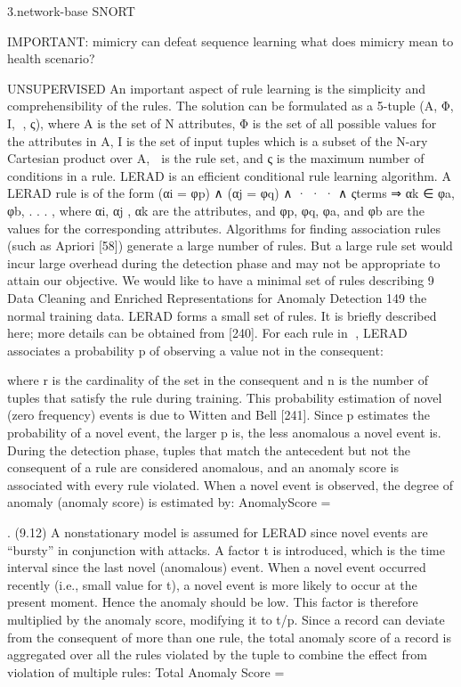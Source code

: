 \documentclass[12pt]{article}
\begin{document}
3.network-base
SNORT

IMPORTANT: mimicry can defeat sequence learning
what does mimicry mean to health scenario?

UNSUPERVISED
An important aspect of rule learning is the simplicity and
comprehensibility of the rules. The solution can be formulated as a 5-tuple
(A, Φ, I, , ς), where A is the set of N attributes, Φ is the set of all possible
values for the attributes in A, I is the set of input tuples which is a subset of
the N-ary Cartesian product over A,  is the rule set, and ς is the maximum
number of conditions in a rule.
LERAD is an efficient conditional rule learning algorithm. A LERAD rule
is of the form
(αi = φp) ∧ (αj = φq) ∧ · · · ∧ ςterms ⇒ αk ∈ {φa, φb, . . . } ,
where αi, αj , αk are the attributes, and φp, φq, φa, and φb are the values for
the corresponding attributes. Algorithms for finding association rules (such
as Apriori [58]) generate a large number of rules. But a large rule set would
incur large overhead during the detection phase and may not be appropriate to
attain our objective. We would like to have a minimal set of rules describing
9 Data Cleaning and Enriched Representations for Anomaly Detection 149
the normal training data. LERAD forms a small set of rules. It is briefly
described here; more details can be obtained from [240].
For each rule in , LERAD associates a probability p of observing a value
not in the consequent:

where r is the cardinality of the set in the consequent and n is the number
of tuples that satisfy the rule during training. This probability estimation of
novel (zero frequency) events is due to Witten and Bell [241]. Since p estimates
the probability of a novel event, the larger p is, the less anomalous a novel
event is. During the detection phase, tuples that match the antecedent but
not the consequent of a rule are considered anomalous, and an anomaly score
is associated with every rule violated. When a novel event is observed, the
degree of anomaly (anomaly score) is estimated by:
AnomalyScore =

. (9.12)
A nonstationary model is assumed for LERAD since novel events are
“bursty” in conjunction with attacks. A factor t is introduced, which is the
time interval since the last novel (anomalous) event. When a novel event occurred
recently (i.e., small value for t), a novel event is more likely to occur at
the present moment. Hence the anomaly should be low. This factor is therefore
multiplied by the anomaly score, modifying it to t/p. Since a record can
deviate from the consequent of more than one rule, the total anomaly score
of a record is aggregated over all the rules violated by the tuple to combine
the effect from violation of multiple rules:
Total Anomaly Score =
\end{document}
